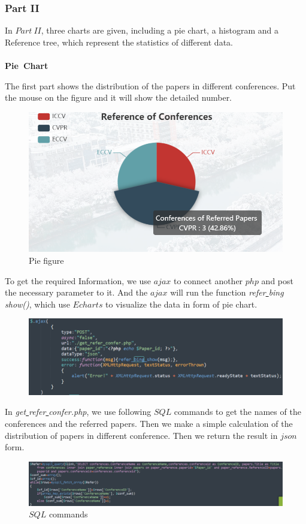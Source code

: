\documentclass{article}
\begin{document}
	\subsubsection{Part II}
	In \(Part\ II\), three charts are given, including a pie chart, a histogram and a Reference tree, which represent the statistics of different data.
	\\
	\\
	\textbf{Pie\ Chart}
	\par The first part shows the distribution of the papers in different conferences. Put the mouse on the figure and it will show the detailed number.
	\begin{figure}[H]
		\centering
		\includegraphics[width=0.5\linewidth]{p_4.png}
		\caption{Pie figure}
	\end{figure}
	To get the required Information, we use \(ajax\) to connect another \(php\) and post the necessary parameter to it. And the \(ajax\) will run the function \emph{refer\underline{ }bing\underline{ }show()}, which use \(Echarts\) to visualize the data in form of pie chart.
	\begin{figure}[H]
		\centering
		\includegraphics[width=0.7\linewidth]{p_10.png}
	\end{figure}
	In \emph{get\underline{ }refer\underline{ }confer.php}, we use following \(SQL\) commands to get the names of the conferences and the referred papers. Then we make a simple calculation of the distribution of papers in different conference. Then we return the result in \(json\) form.
	\begin{figure}[H]
		\centering
		\includegraphics[width=0.9\linewidth]{p_11.png}
		\caption{\(SQL\) commands}
	\end{figure}
\end{document}
